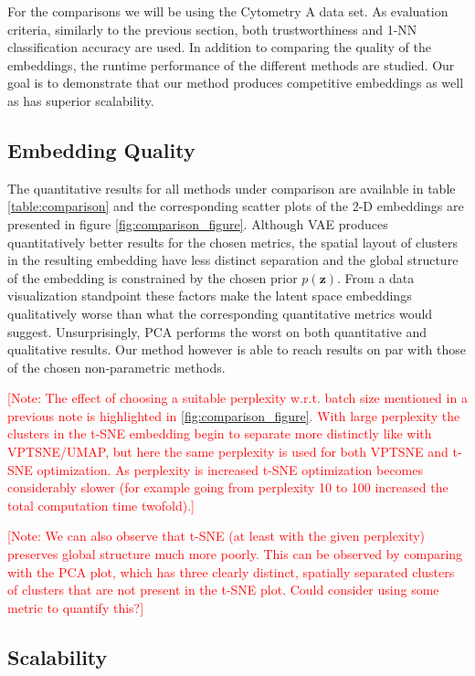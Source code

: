 For the comparisons we will be using the Cytometry A data set. As evaluation criteria, similarly to the previous section, both trustworthiness and 1-NN classification accuracy are used. In addition to comparing the quality of the embeddings, the runtime performance of the different methods are studied. Our goal is to demonstrate that our method produces competitive embeddings as well as has superior scalability.

\subsection{Embedding Quality}
\label{subsubsection:embedding_quality}

The quantitative results for all methods under comparison are available in table \ref{table:comparison} and the corresponding scatter plots of the 2-D embeddings are presented in figure \ref{fig:comparison_figure}. Although VAE produces quantitatively better results for the chosen metrics, the spatial layout of clusters in the resulting embedding have less distinct separation and the global structure of the embedding is constrained by the chosen prior $p(\mathbf{z})$. From a data visualization standpoint these factors make the latent space embeddings qualitatively worse than what the corresponding quantitative metrics would suggest. Unsurprisingly, PCA performs the worst on both quantitative and qualitative results. Our method however is able to reach results on par with those of the chosen non-parametric methods.

\noindent \textcolor{red}{[Note: The effect of choosing a suitable perplexity w.r.t. batch size mentioned in a previous note is highlighted in \ref{fig:comparison_figure}. With large perplexity the clusters in the t-SNE embedding begin to separate more distinctly like with VPTSNE/UMAP, but here the same perplexity is used for both VPTSNE and t-SNE optimization. As perplexity is increased t-SNE optimization becomes considerably slower (for example going from perplexity 10 to 100 increased the total computation time twofold).]}

\noindent \textcolor{red}{[Note: We can also observe that t-SNE (at least with the given perplexity) preserves global structure much more poorly. This can be observed by comparing with the PCA plot, which has three clearly distinct, spatially separated clusters of clusters that are not present in the t-SNE plot. Could consider using some metric to quantify this?]}

\subsection{Scalability}
\label{subsubsection:scalability}

